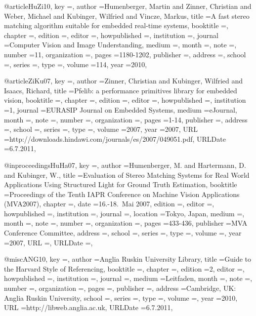 @article{HuZi10,
	key					={},
	author				={Humenberger, Martin and Zinner, Christian and Weber, Michael and Kubinger, Wilfried and Vincze, Markus},
	title				={A fast stereo matching algorithm suitable for embedded real-time systems},
	booktitle			={},
	chapter				={},
	edition				={},
	editor				={},
	howpublished		={},
	institution			={},
	journal				={Computer Vision and Image Understanding},
	medium				={},
	month				={},
	note				={},
	number				={11},
	organization		={},
	pages				={1180-1202},
	publisher			={},
	address				={},
	school				={},
	series				={},
	type				={},
	volume				={114},
	year				={2010},
}

@article{ZiKu07,
	key					={},
	author				={Zinner, Christian and Kubinger, Wilfried and Isaacs, Richard},
	title				={Pfelib: a performance primitives library for embedded vision},
	booktitle			={},
	chapter				={},
	edition				={},
	editor				={},
	howpublished		={},
	institution			={1},
	journal				={EURASIP Journal on Embedded Systems},
	medium				={eJournal},
	month				={},
	note				={},
	number				={},
	organization		={},
	pages				={1-14},
	publisher			={},
	address				={},
	school				={},
	series				={},
	type				={},
	volume				={2007},
	year				={2007},
	URL	  				={http://downloads.hindawi.com/journals/es/2007/049051.pdf},
	URLDate				={6.7.2011},
}

@inproceedings{HuHa07,
	key					={},
	author				={Humenberger, M. and Hartermann, D. and Kubinger, W.},
	title				={Evaluation of Stereo Matching Systems for Real World Applications Using Structured Light for Ground Truth Estimation},
	booktitle			={Proceedings of the Tenth IAPR Conference on Machine Vision Applications (MVA2007)},
	chapter				={},
	date				={16.-18.~Mai 2007},
	edition				={},
	editor				={},
	howpublished		={},
	institution			={},
	journal				={},
	location			={Tokyo, Japan},
	medium				={},
	month				={},
	note				={},
	number				={},
	organization		={},
	pages				={433-436},
	publisher			={MVA Conference Committee},
	address				={},
	school				={},
	series				={},
	type				={},
	volume				={},
	year				={2007},
	URL	  				={},
	URLDate				={},
}

@misc{ANG10,
	key					={},
	author				={{Anglia Ruskin University Library}},
	title				={Guide to the Harvard Style of Referencing},
	booktitle			={},
	chapter				={},
	edition				={2},
	editor				={},
	howpublished		={},
	institution			={},
	journal				={},
	medium				={Leitfaden},
	month				={},
	note				={},
	number				={},
	organization		={},
	pages				={},
	publisher			={},
	address				={Cambridge, UK: Anglia Ruskin University},
	school				={},
	series				={},
	type				={},
	volume				={},
	year				={2010},
	URL	  				={http://libweb.anglia.ac.uk},
	URLDate				={6.7.2011},
}

